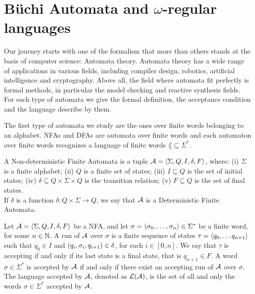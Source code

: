 
\section{B{\"u}chi Automata and \texorpdfstring{$\omega$}{omega}-regular languages}

Our journey starts with one of the formalism that more than others stands at the basis of computer science: Automata theory. 
Automata theory has a wide range of applications in various fields, including compiler design, robotics, artificial intelligence and cryptography. Above all, the field where automata fit perfectly is formal methods, in particular the model checking and reactive synthesis fields. For each type of automata we give the formal definition, the acceptance condition and the language describe by them.

The first type of automata we study are the ones over finite words belonging to an alphabet. 
NFAs and DFAs are automata over finite words and each automaton over finite words recognizes a language of finite words $\lang{} \subseteq \Sigma^*$.

\begin{definition}
A Non-deterministic Finite Automata is a tuple $\mathcal{A} = \langle \Sigma, Q,I,\delta,F \rangle$, where: (i) $\Sigma$ is a finite alphabet; (ii) $Q$ is a finite set of states; (iii) $I \subseteq Q$ is the set of initial states; (iv) $\delta \subseteq Q \times \Sigma \times Q$ is the transition relation; (v) $F \subseteq Q$ is the set of final states. \\
If $\delta$ is a function $\delta \colon Q \times \Sigma \to Q$, we say that $\mathcal{A}$ is a Deterministic Finite Automata.
\end{definition}

\begin{definition}
Let $\mathcal{A} = \langle \Sigma,Q,I,\delta,F \rangle$ be a NFA, and let $\sigma = \left\langle \sigma_0,\dots,\sigma_n \right\rangle \in \Sigma^*$ be a finite word, for some $n \in \mathbb{N}$. 
A run of $\mathcal{A}$ over $\sigma$ is a finite sequence of states $\tau = \left\langle q_0,\dots q_{n+1} \right\rangle$ such that $q_0 \in I$ and $\left( q_i,\sigma_i,q_{i+1} \right) \in \delta$, for each $i \in [0,n]$.
We say that $\tau$ is accepting if and only if its last state is a final state, that is $q_{n+1} \in F$.
A word $\sigma \in \Sigma^*$ is accepted by $\mathcal{A}$ if and only if there exist an accepting run of $\mathcal{A}$ over $\sigma$. The language accepted by $\mathcal{A}$, denoted as $\mathcal{L}{(\mathcal{A})}$, is the set of all and only the words $\sigma \in \Sigma^*$ accepted by $\mathcal{A}$.
\end{definition}

